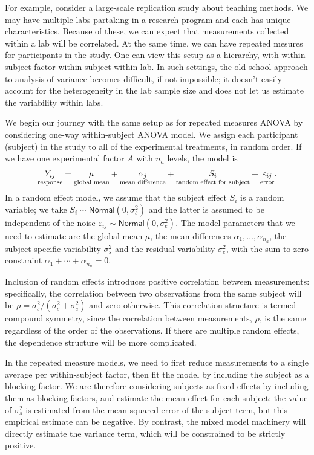 \documentclass[
  11pt,
  letterpaper,
]{scrbook}
\theoremstyle{definition}
\theoremstyle{definition}
\theoremstyle{remark}
\begin{document}
For example, consider a large-scale replication study about teaching
methods. We may have multiple labs partaking in a research program and
each has unique characteristics. Because of these, we can expect that
measurements collected within a lab will be correlated. At the same
time, we can have repeated mesures for participants in the study. One
can view this setup as a hierarchy, with within-subject factor within
subject within lab. In such settings, the old-school approach to
analysis of variance becomes difficult, if not impossible; it doesn't
easily account for the heterogeneity in the lab sample size and does not
let us estimate the variability within labs.

We begin our journey with the same setup as for repeated measures ANOVA
by considering one-way within-subject ANOVA model. We assign each
participant (subject) in the study to all of the experimental
treatments, in random order. If we have one experimental factor \(A\)
with \(n_a\) levels, the model is
\begin{align*}\underset{\text{response}\vphantom{l}}{Y_{ij}} = \underset{\text{global mean}}{\mu_{\vphantom{j}}} + \underset{\text{mean difference}}{\alpha_j} + \underset{\text{random effect for subject}}{S_{i\vphantom{j}}} + \underset{\text{error}\vphantom{l}}{\varepsilon_{ij}}.
\end{align*} In a random effect model, we assume that the subject effect
\(S_i\) is a random variable; we take
\(S_i \sim \mathsf{Normal}(0, \sigma^2_s)\) and the latter is assumed to
be independent of the noise
\(\varepsilon_{ij} \sim \mathsf{Normal}(0, \sigma^2_e)\). The model
parameters that we need to estimate are the global mean \(\mu\), the
mean differences \(\alpha_1, \ldots, \alpha_{n_a}\), the
subject-specific variability \(\sigma^2_s\) and the residual variability
\(\sigma^2_e\), with the sum-to-zero constraint
\(\alpha_1 + \cdots + \alpha_{n_a}=0\).

Inclusion of random effects introduces positive correlation between
measurements: specifically, the correlation between two observations
from the same subject will be
\(\rho=\sigma^2_s/(\sigma^2_s+\sigma^2_e)\) and zero otherwise. This
correlation structure is termed compound symmetry, since the correlation
between measurements, \(\rho\), is the same regardless of the order of
the observations. If there are multiple random effects, the dependence
structure will be more complicated.

In the repeated measure models, we need to first reduce measurements to
a single average per within-subject factor, then fit the model by
including the subject as a blocking factor. We are therefore considering
subjects as fixed effects by including them as blocking factors, and
estimate the mean effect for each subject: the value of \(\sigma^2_s\)
is estimated from the mean squared error of the subject term, but this
empirical estimate can be negative. By contrast, the mixed model
machinery will directly estimate the variance term, which will be
constrained to be strictly positive.
\end{document}

